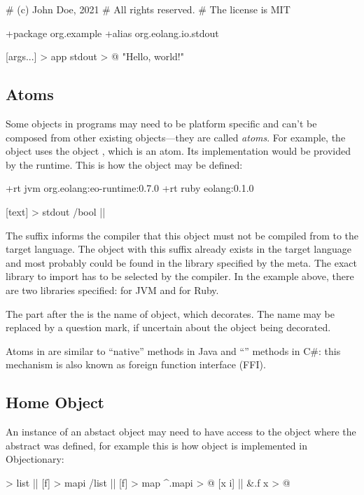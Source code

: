 \begin{ffcode}
# (c) John Doe, 2021
# All rights reserved.
# The license is MIT

+package org.example
+alias org.eolang.io.stdout

[args...] > app
  stdout > @
    "Hello, world!\n"
\end{ffcode}

\subsection{Atoms}

Some objects in \eo{} programs may need to be platform specific
and can't be composed from other existing objects---they are called
\emph{atoms}.
For example, the object  uses the object ,
which is an atom. Its implementation would be provided by the
runtime. This is how the object may be defined:

\begin{ffcode}
+rt jvm org.eolang:eo-runtime:0.7.0
+rt ruby eolang:0.1.0

[text] > stdout /bool |$\label{ln:stdout}$|
\end{ffcode}

The  suffix informs the compiler that this object must
not be compiled from \eo{} to the target language. The object
with this suffix already exists in the target language and most
probably could be found in the library specified by the 
meta. The exact library to import has to be selected by the compiler.
In the example above, there are two libraries specified: for JVM and
for Ruby.

The  part after the \ff{/} is the name of
object, which  decorates. The name may be replaced by
a question mark, if uncertain about the object being decorated.

Atoms in \eo{} are similar to ``native'' methods in Java and ``'' methods in C\#: this mechanism is also known as foreign function interface (FFI).

\subsection{Home Object}

An instance of an abstact object may need to have access to the
object where the abstract was defined, for example this is
how object  is implemented in Objectionary:

\begin{ffcode}
[] > list |$\label{ln:list-parent}$|
  [f] > mapi /list |$\label{ln:list-map}$|
  [f] > map
    ^.mapi > @
      [x i] |$\label{ln:map-inner}$|
        &.f x > @
\end{ffcode}

